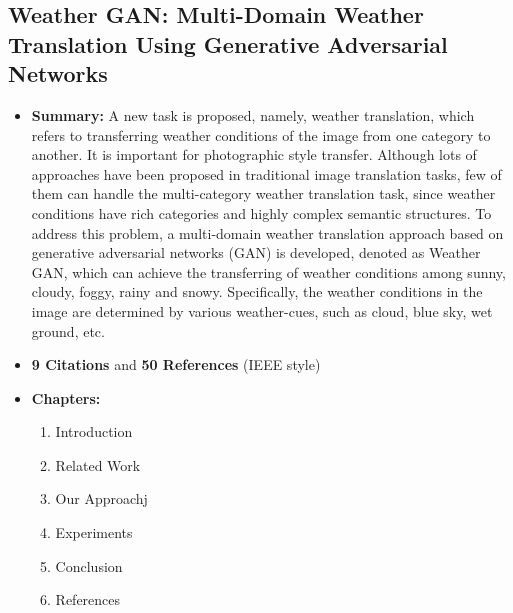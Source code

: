 \documentclass[11pt]{article}
\begin{document}
    \subsection{Weather GAN: Multi-Domain Weather Translation Using Generative Adversarial Networks \cite{DBLP:journals/corr/abs-2103-05422}}
    \begin{itemize}
        \item \textbf{Summary:} A new task is proposed, namely, weather translation, which refers to 
            transferring weather conditions of the image from one category to another. It is important
            for photographic style transfer. Although lots of approaches have been proposed in traditional 
            image translation tasks, few of them can handle the multi-category weather translation task, since 
            weather conditions have rich categories and highly complex semantic structures. To address 
            this problem, a multi-domain weather translation approach based on generative 
            adversarial networks (GAN) is developed, denoted as Weather GAN, which can achieve the transferring of 
            weather conditions among sunny, cloudy, foggy, rainy and snowy. Specifically, the weather 
            conditions in the image are determined by various weather-cues, such as cloud, blue sky, 
            wet ground, etc.
        \item \textbf{9 Citations} and \textbf{50 References} (IEEE style)
        \item \textbf{Chapters:}
            \begin{enumerate}
                \item Introduction
                \item Related Work
                \item Our Approachj
                \item Experiments
                \item Conclusion 
                \item References 
            \end{enumerate}
    \end{itemize}
\end{document}
